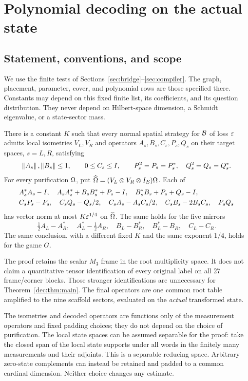 \section{Polynomial decoding on the actual state}\label{sec:decoding}
\subsection{Statement, conventions, and scope}
We use the finite tests of Sections~\ref{sec:bridge}--\ref{sec:compiler}. The graph, placement, parameter, cover, and polynomial rows are those specified there. Constants may depend on this fixed finite list, its coefficients, and its question distribution. They never depend on Hilbert-space dimension, a Schmidt eigenvalue, or a state-sector mass.

\begin{theorem}\label{dec:thm:main}
There is a constant $K$ such that every normal spatial strategy for $\mathcal B$ of loss $\varepsilon$ admits local isometries $V_L,V_R$ and operators $A_s,B_s,C_s,P_s,Q_s$ on their target spaces, $s=L,R$, satisfying
\[
\left\lVert A_s\right\rVert,\left\lVert B_s\right\rVert\le1,\qquad 0\le C_s\le I,
\qquad P_s^2=P_s=P_s^*,\quad Q_s^2=Q_s=Q_s^*.
\]
For every purification $\Omega$, put $\widehat{\Omega}=(V_L\otimes V_R\otimes I_E)\Omega$. Each of
\begin{align*}
&A_s^*A_s-I,\quad A_sA_s^*+B_sB_s^*+P_s-I,
\quad B_s^*B_s+P_s+Q_s-I,\\
&C_sP_s-P_s,\quad C_sQ_s-Q_s/2,\quad
C_sA_s-A_sC_s/2,\quad C_sB_s-2B_sC_s,\quad P_sQ_s
\end{align*}
has vector norm at most $K\varepsilon^{1/4}$ on $\widehat{\Omega}$. The same holds for the five mirrors
\begin{equation}\label{dec:eq:five}
\tfrac12A_L-A_R^*,\quad A_L^*-\tfrac12A_R,\quad
B_L-B_R^*,\quad B_L^*-B_R,\quad C_L-C_R.
\end{equation}
The same conclusion, with a different fixed $K$ and the same exponent $1/4$, holds for the game $G$.
\end{theorem}

The proof retains the scalar $M_3$ frame in the root multiplicity space. It does not claim a quantitative tensor identification of every original label on all 27 frame/corner blocks. Those stronger identifications are unnecessary for Theorem~\ref{dec:thm:main}. The final operators are one common root table amplified to the nine scaffold sectors, evaluated on the \emph{actual} transformed state.

The isometries and decoded operators are functions only of the measurement operators and fixed padding choices; they do not depend on the choice of purification. The local state spaces can be assumed separable for the proof: take the closed span of the local state supports under all words in the finitely many measurements and their adjoints. This is a separable reducing space. Arbitrary zero-state complements can instead be retained and padded to a common cardinal dimension. Neither choice changes any estimate.

